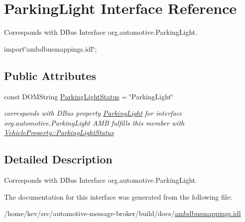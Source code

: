 \hypertarget{interfaceParkingLight}{\section{Parking\+Light Interface Reference}
\label{interfaceParkingLight}
}


Corresponds with D\+Bus Interface org.\+automotive.\+Parking\+Light.  




{\ttfamily import\char`\"{}ambdbusmappings.\+idl\char`\"{};}

\subsection*{Public Attributes}
\begin{DoxyCompactItemize}
\item 
\hypertarget{interfaceParkingLight_a2f2441de52369f858974a311cfab4c30}{const D\+O\+M\+String \hyperlink{interfaceParkingLight_a2f2441de52369f858974a311cfab4c30}{Parking\+Light\+Status} = \char`\"{}Parking\+Light\char`\"{}}\label{interfaceParkingLight_a2f2441de52369f858974a311cfab4c30}

\begin{DoxyCompactList}\small\item\em corresponds with D\+Bus property \hyperlink{interfaceParkingLight}{Parking\+Light} for interface org.\+automotive.\+Parking\+Light A\+M\+B fulfills this member with \hyperlink{classVehicleProperty_a505ffc37974f674df55a97c27a7ba0b7}{Vehicle\+Property\+::\+Parking\+Light\+Status} \end{DoxyCompactList}\end{DoxyCompactItemize}


\subsection{Detailed Description}
Corresponds with D\+Bus Interface org.\+automotive.\+Parking\+Light. 

The documentation for this interface was generated from the following file\+:\begin{DoxyCompactItemize}
\item 
/home/kev/src/automotive-\/message-\/broker/build/docs/\hyperlink{ambdbusmappings_8idl}{ambdbusmappings.\+idl}\end{DoxyCompactItemize}

